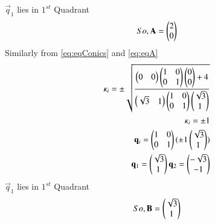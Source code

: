 \documentclass[journal,12pt,twocolumn]{IEEEtran}
\begin{document}
$\vec{q}_1 $ lies in $1^{st}$ Quadrant 
\begin{align}
    So, \mathbf{A}=\begin{pmatrix}2\\0\end{pmatrix}
\end{align}
Similarly
from \eqref{eq:eqConics} and \eqref{eq:eqA}
\begin{align}
\kappa_i = \pm \sqrt{\frac{\begin{pmatrix}0&0\end{pmatrix} \begin{pmatrix}1&0\\0&1\end{pmatrix} \begin{pmatrix}0\\0\end{pmatrix}+4} {\begin{pmatrix}\sqrt{3} & 1\end{pmatrix}\begin{pmatrix}1&0\\0&1\end{pmatrix}\begin{pmatrix}\sqrt{3} \\ 1\end{pmatrix}}}  \\
    \kappa_i = \pm 1  \\
    \mathbf{q}_i = \begin{pmatrix}1&0 \\ 0&1\end{pmatrix} (\pm 1 \begin{pmatrix}\sqrt{3}\\1\end{pmatrix}) \\
    \mathbf{q}_1   = \begin{pmatrix}\sqrt{3} \\1\end{pmatrix} 
    \mathbf{q}_2 = \begin{pmatrix}-\sqrt{3}\\-1\end{pmatrix}
\end{align}
$\vec{q}_1 $ lies in $1^{st}$ Quadrant 
\begin{align}
    So, \mathbf{B}=\begin{pmatrix}\sqrt{3}\\1\end{pmatrix}
\end{align}
\end{document}
